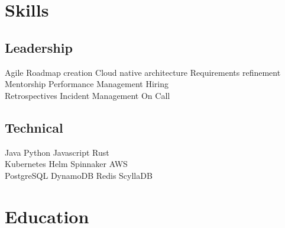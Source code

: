 \documentclass[]{deedy-resume-openfont}
\begin{document}
\section{Skills}
\begin{minipage}[t]{.55\textwidth}
\subsection{Leadership}
Agile \textbullet{} Roadmap creation \textbullet{} Cloud native architecture \textbullet{} Requirements refinement \\
\vspace{\topsep}
Mentorship \textbullet{} Performance Management \textbullet{} Hiring \\
\vspace{\topsep}
Retrospectives \textbullet{} Incident Management \textbullet{} On Call
\sectionsep
\end{minipage}
\hfill
\begin{minipage}[t]{.4\textwidth}
\subsection{Technical}
 Java \textbullet{} Python \textbullet{} Javascript \textbullet{} Rust \\
\vspace{\topsep}
 Kubernetes \textbullet{} Helm \textbullet{} Spinnaker \textbullet{} AWS \\
\vspace{\topsep}
 PostgreSQL \textbullet{} DynamoDB \textbullet{} Redis \textbullet{} ScyllaDB
\end{minipage}

\sectionsep

\section{Education}
\sectionsep

\sectionsep
\end{document}
